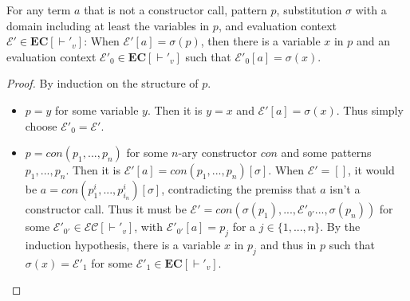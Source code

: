 \begin{fact}
\label{fac:app1}
For any term $a$ that is not a constructor call, pattern $p$, substitution $\sigma$ with a domain including at least the variables in $p$, and evaluation context $\mathcal{E}' \in \mathbf{EC}[\vdash'_v]$: When $\mathcal{E}'[a] = \sigma(p)$, then there is a variable $x$ in $p$ and an evaluation context $\mathcal{E}'_0 \in \mathbf{EC}[\vdash'_v]$ such that $\mathcal{E}'_0[a] = \sigma(x)$.
\begin{proof}
By induction on the structure of $p$.
\begin{itemize}
\item $p= y$ for some variable $y$.
Then it is $y = x$ and $\mathcal{E}'[a] = \sigma(x)$. Thus simply choose $\mathcal{E}'_0 = \mathcal{E}'$.

\item $p = con(p_1, ..., p_n)$ for some $n$-ary constructor $con$ and some patterns $p_1, ..., p_n$.
Then it is $\mathcal{E}'[a] = con(p_1, ..., p_n)[\sigma]$. When $\mathcal{E}' = []$, it would be $a = con(p^i_1, ..., p^i_{i_n})[\sigma]$, contradicting the premiss that $a$ isn't a constructor call. Thus it must be $\mathcal{E}' = con(\sigma(p_1), ..., \mathcal{E}'_{0'} ..., \sigma(p_n))$ for some $\mathcal{E}'_{0'} \in \mathcal{EC}[\vdash'_v]$, with $\mathcal{E}'_{0'}[a] = p_j$ for a $j \in \{1, ..., n\}$. By the induction hypothesis, there is a variable $x$ in $p_j$ and thus in $p$ such that $\sigma(x) = \mathcal{E}'_1$ for some $\mathcal{E}'_1 \in \mathbf{EC}[\vdash'_v]$.
\end{itemize}
\end{proof}
\end{fact}

